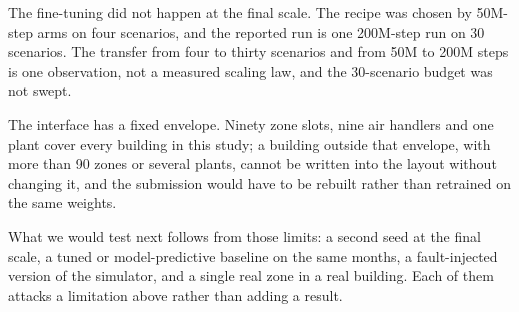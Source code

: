 \documentclass{article}
\begin{document}
The fine-tuning did not happen at the final scale. The recipe was chosen by 50M-step arms on four scenarios, and the reported run is one 200M-step run on 30 scenarios. The transfer from four to thirty scenarios and from 50M to 200M steps is one observation, not a measured scaling law, and the 30-scenario budget was not swept.

The interface has a fixed envelope. Ninety zone slots, nine air handlers and one plant cover every building in this study; a building outside that envelope, with more than 90 zones or several plants, cannot be written into the layout without changing it, and the submission would have to be rebuilt rather than retrained on the same weights.

What we would test next follows from those limits: a second seed at the final scale, a tuned or model-predictive baseline on the same months, a fault-injected version of the simulator, and a single real zone in a real building. Each of them attacks a limitation above rather than adding a result.
\end{document}
